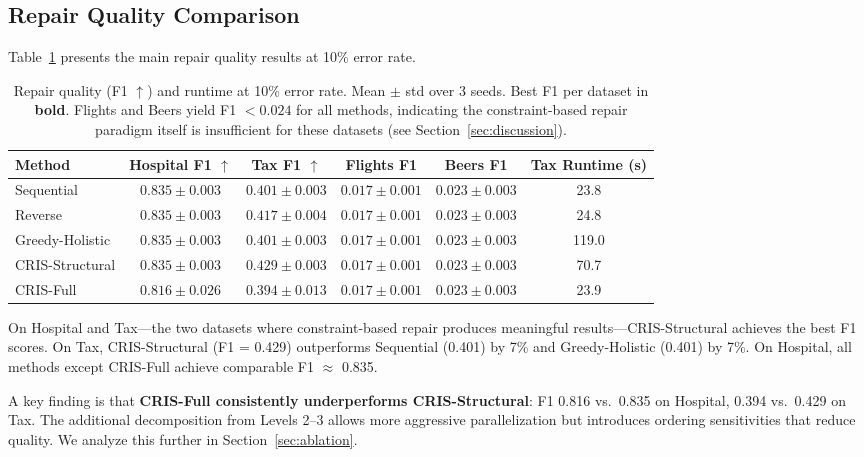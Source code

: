 \documentclass{article}
\newcommand{\cris}{\textsc{CRIS}\xspace}
\begin{document}
\subsection{Repair Quality Comparison}
\label{sec:quality}

Table~\ref{tab:main} presents the main repair quality results at 10\% error rate.

\begin{table}[t]
\caption{Repair quality (F1 $\uparrow$) and runtime at 10\% error rate. Mean $\pm$ std over 3 seeds. Best F1 per dataset in \textbf{bold}. Flights and Beers yield F1 $< 0.024$ for all methods, indicating the constraint-based repair paradigm itself is insufficient for these datasets (see Section~\ref{sec:discussion}).}
\label{tab:main}
\centering
\small
\begin{tabular}{lccccc}
\toprule
Method & Hospital F1 $\uparrow$ & Tax F1 $\uparrow$ & Flights F1 & Beers F1 & Tax Runtime (s) \\
\midrule
Sequential & $0.835 \pm 0.003$ & $0.401 \pm 0.003$ & $0.017 \pm 0.001$ & $0.023 \pm 0.003$ & 23.8 \\
Reverse & $0.835 \pm 0.003$ & $0.417 \pm 0.004$ & $0.017 \pm 0.001$ & $0.023 \pm 0.003$ & 24.8 \\
Greedy-Holistic & $0.835 \pm 0.003$ & $0.401 \pm 0.003$ & $0.017 \pm 0.001$ & $0.023 \pm 0.003$ & 119.0 \\
\cris-Structural & $\mathbf{0.835 \pm 0.003}$ & $\mathbf{0.429 \pm 0.003}$ & $0.017 \pm 0.001$ & $0.023 \pm 0.003$ & 70.7 \\
\cris-Full & $0.816 \pm 0.026$ & $0.394 \pm 0.013$ & $0.017 \pm 0.001$ & $0.023 \pm 0.003$ & 23.9 \\
\bottomrule
\end{tabular}
\end{table}

On Hospital and Tax---the two datasets where constraint-based repair produces meaningful results---\cris-Structural achieves the best F1 scores. On Tax, \cris-Structural (F1 = 0.429) outperforms Sequential (0.401) by 7\% and Greedy-Holistic (0.401) by 7\%. On Hospital, all methods except \cris-Full achieve comparable F1 $\approx$ 0.835.

A key finding is that \textbf{\cris-Full consistently underperforms \cris-Structural}: F1 0.816 vs.\ 0.835 on Hospital, 0.394 vs.\ 0.429 on Tax. The additional decomposition from Levels 2--3 allows more aggressive parallelization but introduces ordering sensitivities that reduce quality. We analyze this further in Section~\ref{sec:ablation}.
\end{document}
